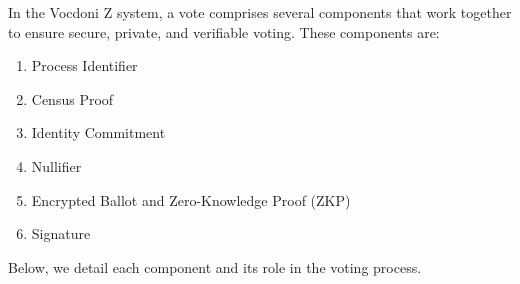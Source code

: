 
In the Vocdoni Z system, a vote comprises several components that work together to ensure secure, private, and verifiable voting. These components are:

\begin{enumerate}
	\item Process Identifier
	\item Census Proof
	\item Identity Commitment
	\item Nullifier
	\item Encrypted Ballot and Zero-Knowledge Proof (ZKP)
	\item Signature	
\end{enumerate}

Below, we detail each component and its role in the voting process.

